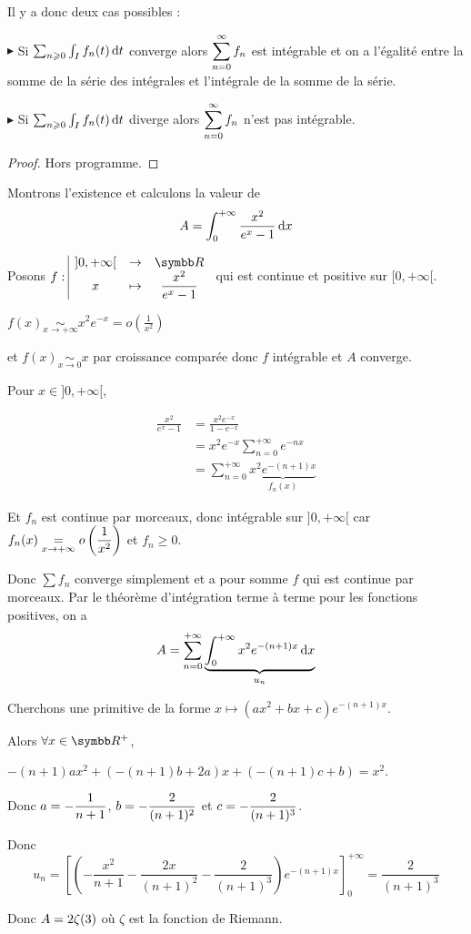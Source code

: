 Il y a donc deux cas possibles : 

$\blacktriangleright$ Si $\sum_{n \geqslant 0} \int_I f_n(t) \,\mathrm{d}t$ converge alors $\displaystyle \sum_{n = 0}^{\infty} f_n$ est intégrable 
et on a l'égalité entre la somme de la série des intégrales et l'intégrale de la somme de la série.

\avspace $\blacktriangleright$ Si $\sum_{n \geqslant 0} \int_I f_n(t) \,\mathrm{d}t$ diverge alors $\displaystyle \sum_{n = 0}^{\infty} f_n$ n'est pas intégrable.

\begin{proof}
    Hors programme. 
\end{proof}

\begin{exemple}
    Montrons l'existence et calculons la valeur de
    $$ A = \int_{0}^{+ \infty} \frac{x^2}{e^x - 1} \,\mathrm{d}x$$ 

    Posons $\fonction f {]0, + \infty[}{\R}{x}{\frac{x^2}{e^x - 1}}$ qui est continue et positive sur $[0, + \infty[$.

    $f(x) \underset{x \to + \infty}{\sim} x^2 e^{-x} = o\left( \frac 1 {x^2} \right)$ 
    
    et $f(x) \underset{x \to 0 }{\sim} x$ par croissance comparée donc $f$ intégrable et $A$ converge. 

    \avspace Pour $x \in ]0, + \infty[$, 
    
    \begin{align}
        \frac{x^2}{e^x - 1 } & = \frac{x^2 e^{-x}}{1 - e^{-x}} \\
        & = x^2 e^{-x} \sum_{n = 0}^{+ \infty} e^{-nx} \\
        & = \sum_{n = 0}^{+ \infty} \underbrace{x^2 e^{-(n + 1)x}}_{f_n(x)}
    \end{align}

    Et $f_n$ est continue par morceaux, donc intégrable sur $]0, + \infty[$ car \\
    $\displaystyle f_n(x) \underset{x \to + \infty}{=} o\left( \frac 1 {x^2} \right)$ et $f_n \geqslant 0$.

    Donc $\sum f_n$ converge simplement et a pour somme $f$ qui est continue par morceaux.
    Par le théorème d'intégration terme à terme pour les fonctions positives, on a
    $$A = \sum_{n = 0}^{+ \infty} \underbrace{\int_0^{+ \infty} x^2 e^{-(n + 1)x} \,\mathrm{d}x}_{u_n}$$

    Cherchons une primitive de la forme $x \mapsto (ax^2 + bx + c)e^{-(n + 1)x}$.

    Alors $\forall x \in \R^+$,

    $-(n+1)ax^2 + (-(n + 1)b + 2a)x + (-(n + 1)c + b) = x^2$.

    Donc $\displaystyle a = - \frac 1 {n + 1}$, $\displaystyle b = - \frac 2 {(n + 1)^2}$ et $\displaystyle c = - \frac 2 {(n + 1)^3}$.

    Donc 
    $$u_n = \left[ \left( - \frac{x^2}{n + 1} - \frac{2x}{(n + 1)^2} - \frac{2}{(n + 1)^3} \right) e^{-(n + 1)x} \right]_0^{+ \infty} = \frac{2}{(n + 1)^3}$$

    Donc $\displaystyle A = 2 \zeta(3)$ où $\zeta$ est la fonction de Riemann.
\end{exemple}

